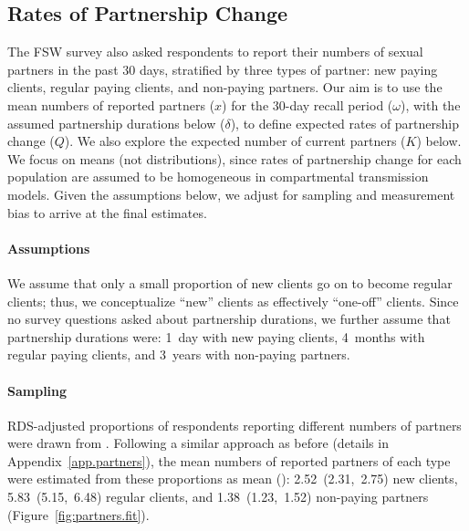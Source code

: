\subsection{Rates of Partnership Change}\label{meth.partners}
The FSW survey \cite{Baral2014} also asked respondents to report  %
their numbers of sexual partners in the past 30 days,
stratified by three types of partner:
new paying clients, regular paying clients, and non-paying partners.
Our aim is to use the mean numbers of reported partners ($x$) %
for the 30-day recall period ($\omega$),
with the assumed partnership durations below ($\delta$),
to define expected rates of partnership change ($Q$).
We also explore the expected number of current partners ($K$) below. %
We focus on means (not distributions), since
rates of partnership change for each population are assumed to be
homogeneous in compartmental transmission models. %
Given the assumptions below, we adjust for sampling and measurement bias
to arrive at the final estimates.
\paragraph{Assumptions} %
We assume that
only a small proportion of new clients go on to become regular clients;
thus, we conceptualize ``new'' clients as effectively ``one-off'' clients.
Since no survey questions asked about partnership durations,
we further assume that partnership durations were:
1~day with new paying clients,
4~months with regular paying clients, and
3~years with non-paying partners.
\paragraph{Sampling}
RDS-adjusted proportions of respondents reporting different numbers of partners
were drawn from \cite{Baral2014}.
Following a similar approach as before (details in Appendix~\ref{app.partners}),
the mean numbers of reported partners of each type
were estimated from these proportions as mean (\ci):
2.52~(2.31,~2.75) new clients,
5.83~(5.15,~6.48) regular clients, and
1.38~(1.23,~1.52) non-paying partners
(Figure~\ref{fig:partners.fit}).
